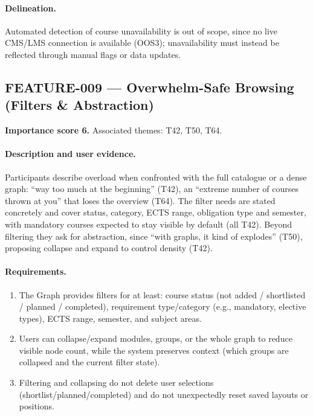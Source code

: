 \paragraph{Delineation.}
Automated detection of course unavailability is out of scope, since no live CMS/LMS connection is available (OOS3); unavailability must instead be reflected through manual flags or data updates.

\subsection{FEATURE-009 --- Overwhelm-Safe Browsing (Filters \& Abstraction)}
\label{feat:009}
\textbf{Importance score 6.} Associated themes: T42, T50, T64.

\paragraph{Description and user evidence.}
Participants describe overload when confronted with the full catalogue or a dense graph: \enquote{way too much at the beginning} (T42), an \enquote{extreme number of courses thrown at you} that loses the overview (T64). The filter needs are stated concretely and cover status, category, ECTS range, obligation type and semester, with mandatory courses expected to stay visible by default (all T42). Beyond filtering they ask for abstraction, since \enquote{with graphs, it kind of explodes} (T50), proposing collapse and expand to control density (T42).

\paragraph{Requirements.}
\begin{enumerate}
    \item The Graph provides filters for at least: course status (not added / shortlisted / planned / completed), requirement type/category (e.g., mandatory, elective types), ECTS range, semester, and subject areas.
    \item Users can collapse/expand modules, groups, or the whole graph to reduce visible node count, while the system preserves context (which groups are collapsed and the current filter state).
    \item Filtering and collapsing do not delete user selections (shortlist/planned/completed) and do not unexpectedly reset saved layouts or positions.
\end{enumerate}


